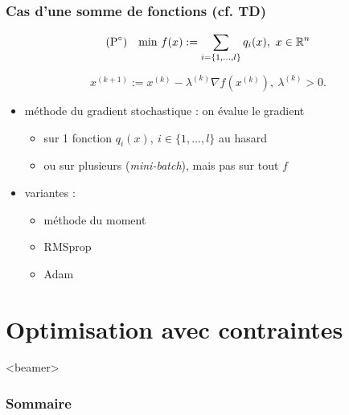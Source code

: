 \documentclass{beamer}
\newcommand{\R}{{\ensuremath\mathbb{R}}}
\begin{document}
\begin{frame}
  \frametitle{Cas d'une somme de fonctions (cf. TD)}

  \[
  (\text{P}^\circ) \quad
    \text{min} \ f(x) := \sum_{i = \{1,\dots,l\}} q_i(x), \ x \in \R^n
  \]

  \[ x^{(k+1)} := x^{(k)} - \lambda^{(k)} {\nabla f}(x^{(k)}), \ \lambda^{(k)} > 0. \]
  
  \begin{itemize}
  \item méthode du gradient stochastique : on évalue le gradient
    \begin{itemize}
    \item sur 1 fonction $q_i(x), \ i \in \{1,\dots,l\}$ au hasard
    \item ou sur plusieurs (\emph{mini-batch}), mais pas sur tout $f$
    \end{itemize}
  \item variantes :
    \begin{itemize}
    \item méthode du moment 
    \item RMSprop
    \item Adam
    \end{itemize}
  \end{itemize}
  
\end{frame}


\section{Optimisation avec contraintes}

\begin{frame}<beamer>
  \frametitle{Sommaire}
  \tableofcontents[currentsection]
\end{frame}
\end{document}

